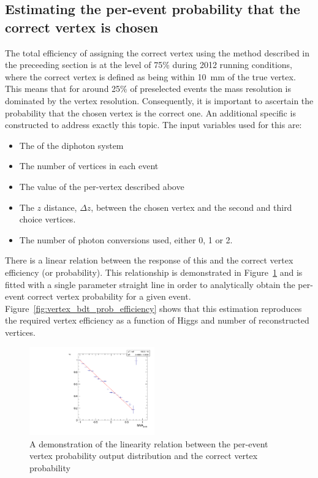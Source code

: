 \subsection{Estimating the per-event probability that the correct vertex is chosen}
\label{sec:bdt_prob}

The total efficiency of assigning the correct vertex using the method described in the preceeding section is at the level of 75\% during 2012 running conditions, where the correct vertex is defined as being within 10~mm of the true vertex. This means that for around 25\% of preselected events the mass resolution is dominated by the vertex resolution. Consequently, it is important to ascertain the probability that the chosen vertex is the correct one. An additional specific \BDT is constructed to address exactly this topic. The input variables used for this \BDT are:

\begin{itemize}
  \item The \pT of the diphoton system
  \item The number of vertices in each event
  \item The value of the per-vertex \BDT described above
  \item The $z$ distance, $\Delta z$, between the chosen vertex and the second and third choice vertices.
  \item The number of photon conversions used, either 0, 1 or 2.
\end{itemize}

There is a linear relation between the response of this \BDT and the correct vertex efficiency (or probability). This relationship is demonstrated in Figure~\ref{fig:vertex_bdt_prob} and is fitted with a single parameter straight line in order to analytically obtain the per-event correct vertex probability for a given event. Figure~\ref{fig:vertex_bdt_prob_efficiency} shows that this estimation reproduces the required vertex efficiency as a function of Higgs \pT and number of reconstructed vertices.

\begin{figure}
  \includegraphics[width=0.48\textwidth]{ch3_comm_anal_comps/plots/vertex_bdt_prob.pdf}
  \caption{A demonstration of the linearity relation between the per-event vertex probability \BDT output distribution and the correct vertex probability}
  \label{fig:vertex_bdt_prob}
\end{figure}

